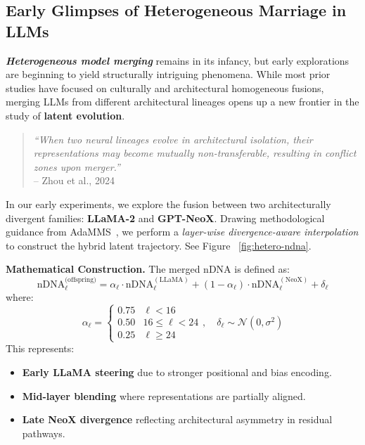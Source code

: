 \subsection{Early Glimpses of Heterogeneous Marriage in LLMs}

\textbf{\emph{Heterogeneous model merging}} remains in its infancy, but early explorations are beginning to yield structurally intriguing phenomena. While most prior studies have focused on culturally and architectural homogeneous fusions, merging LLMs from different architectural lineages opens up a new frontier in the study of \textbf{latent evolution}.

\begin{quote}
\emph{“When two neural lineages evolve in architectural isolation, their representations may become
mutually non-transferable, resulting in conflict zones upon merger.”} \\
\hfill -- Zhou et al., 2024~\cite{zhou2024hybrid}
\end{quote}

In our early experiments, we explore the fusion between two architecturally divergent families: \textbf{LLaMA-2} and \textbf{GPT-NeoX}. Drawing methodological guidance from AdaMMS~\cite{du2025adammsmodelmergingheterogeneous}, we perform a \textit{layer-wise divergence-aware interpolation} to construct the hybrid latent trajectory. See Figure ~\ref{fig:hetero-ndna}.

\vspace{0.5em}
\textbf{Mathematical Construction.} The merged nDNA is defined as:
\[
\text{nDNA}_\ell^{\text{(offspring)}} = \alpha_\ell \cdot \text{nDNA}_\ell^{(\text{LLaMA})} + (1 - \alpha_\ell) \cdot \text{nDNA}_\ell^{(\text{NeoX})} + \delta_\ell
\]
where:
\[
\alpha_\ell =
\begin{cases}
0.75 & \ell < 16 \\
0.50 & 16 \leq \ell < 24 \\
0.25 & \ell \geq 24
\end{cases}, \quad \delta_\ell \sim \mathcal{N}(0, \sigma^2)
\]
This represents:
\begin{itemize}[leftmargin=1.5em]
  \item \textbf{Early LLaMA steering} due to stronger positional and bias encoding.
  \item \textbf{Mid-layer blending} where representations are partially aligned.
  \item \textbf{Late NeoX divergence} reflecting architectural asymmetry in residual pathways.
\end{itemize}

